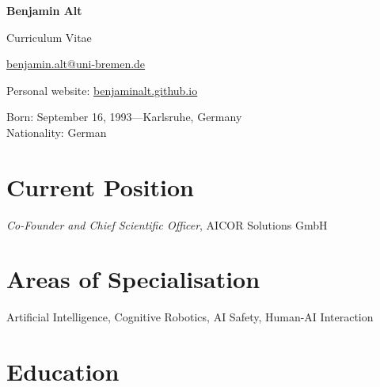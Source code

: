 \documentclass[11pt]{article} %
\begin{document}

{\LARGE\bfseries Benjamin Alt}

\bigskip

Curriculum Vitae

\bigskip\medskip %

\begin{minipage}{.5\textwidth}
\href{mailto:benjamin.alt@uni-bremen.de}{benjamin.alt@uni-bremen.de}
\end{minipage}%

\medskip %

Personal website: \href{https://benjaminalt.github.io}{benjaminalt.github.io} %

\medskip %

Born: September 16, 1993---Karlsruhe, Germany\\ %
Nationality: German %


\section*{Current Position}

\emph{Co-Founder and Chief Scientific Officer}, AICOR Solutions GmbH %


\section*{Areas of Specialisation}

Artificial Intelligence, Cognitive Robotics, AI Safety, Human-AI Interaction %


\section*{Education}
\end{document}
